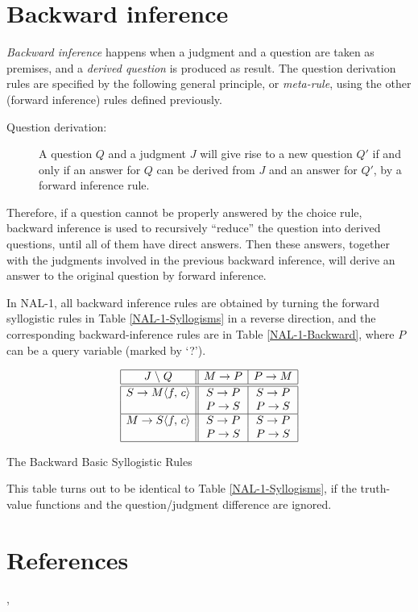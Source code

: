 \section{Backward inference}

\emph{Backward inference} happens when a judgment and a question are taken as premises, and a \emph{derived question} is produced as result. The question derivation rules are specified by the following general principle, or \emph{meta-rule}, using the other (forward inference) rules defined previously. 
\begin{description}
	\item[Question derivation:] A question $Q$ and a judgment $J$ will give rise to a new question $Q'$ if and only if an answer for $Q$ can be derived from $J$ and an answer for $Q'$, by a forward inference rule. 
\end{description}

Therefore, if a question cannot be properly answered by the choice rule, backward inference is used to recursively ``reduce'' the question into derived questions, until all of them have direct answers. Then these answers, together with the judgments involved in the previous backward inference, will derive an answer to the original question by forward inference.

In NAL-1, all backward inference rules are obtained by turning the forward syllogistic rules in Table \ref{NAL-1-Syllogisms} in a reverse direction, and the corresponding backward-inference rules are in Table \ref{NAL-1-Backward}, where $P$ can be a query variable (marked by `?').

\begin{table}[htb]
\[\begin{array}{|c||c|c|} \hline
J \; \backslash \; Q
        & M \rightarrow P       & P \rightarrow M \\
\hline \hline
S \rightarrow M \langle f, \, c\rangle  & S \rightarrow P   & S \rightarrow P \\
                              & P \rightarrow S   & P \rightarrow S \\
\hline
M \rightarrow S \langle f, \, c\rangle  & S \rightarrow P   & S \rightarrow P \\
                              & P \rightarrow S   & P \rightarrow S \\
\hline \end{array}\]
\caption{The Backward Basic Syllogistic Rules}
\label{NAL-1-Backward}
\end{table}

This table turns out to be identical to Table \ref{NAL-1-Syllogisms}, if the truth-value functions  and the question/judgment difference are ignored.

\section*{References}

\cite[Chapter 3]{wp:book1}, \cite{wp:nal2,wp:ref2,wp:bias2,wp:fuzzy2,wp:syllogism,wp:higher2,wp:bayes3,wp:seman2,wp:formal-evidence}
